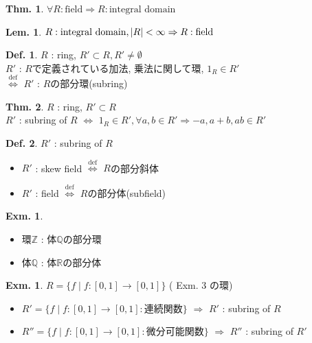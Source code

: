 \documentclass[uplatex,dvipdfmx,9pt]{beamer}
\newcommand{\defarrow}{\overset{\mathrm{def}}{\Leftrightarrow}}
\newcommand{\lt}{\ensuremath <}
\newcommand{\Z}{\mathbb{Z}}
\newcommand{\Q}{\mathbb{Q}}
\newcommand{\R}{\mathbb{R}}
\newcounter{textLemCount}
\newcounter{textExmCount}
\theoremstyle{definition} %
\newtheorem{defn}{Def.}[subsection] %
\newtheorem{thm}{Thm.}[subsection] %
\newtheorem{lemText}[textLemCount]{Lem.} %
\theoremstyle{example}
\newtheorem{exmText}[textExmCount]{Exm.}
\begin{document}
    \begin{frame}

      \begin{thm}
        $\forall R : \text{field} \Rightarrow R : \text{integral domain}$
      \end{thm}

      \begin{lemText}
        $R : \text{integral domain}, |R| \lt \infty \Rightarrow R : \text{field}$
      \end{lemText}

      \begin{defn}
        $R$ : ring, $R' \subset R, R' \neq \emptyset$ \\
        $R'$ : $R$で定義されている加法, 乗法に関して環, $1_R \in R'$ \\
        $\defarrow$ $R'$ : $R$の\alert{部分環(subring)}
      \end{defn}

      \begin{thm}
        $R$ : ring, $R' \subset R$ \\
        $R'$ : subring of $R$ $\Leftrightarrow$ $1_R \in R', \forall a, b \in R' \Rightarrow -a, a+b, ab \in R'$
      \end{thm}

    \end{frame}

    \begin{frame}

      \begin{defn}
        $R'$ : subring of $R$ \\
        \begin{itemize}
          \item $R'$ : skew field $\defarrow$ $R$の\alert{部分斜体}
          \item $R'$ : field $\defarrow$ $R$の\alert{部分体(subfield)}
        \end{itemize}
      \end{defn}

      \begin{exmText}
        \begin{itemize}
          \item 環$\Z$ : 体$\Q$の部分環
          \item 体$\Q$ : 体$\R$の部分体
        \end{itemize}
      \end{exmText}
 
      \begin{exmText}
        $R = \{f \mid f\colon [0,1] \to [0,1]\}$ ( Exm. 3 の環)
        \begin{itemize}
          \item $R' = \{f \mid f\colon [0,1] \to [0,1] : \text{連続関数}\}$ $\Rightarrow$ $R'$ : subring of $R$
          \item $R'' = \{f \mid f\colon [0,1] \to [0,1] : \text{微分可能関数}\}$ $\Rightarrow$ $R''$ : subring of $R'$
        \end{itemize}
      \end{exmText}

    \end{frame}
\end{document}
